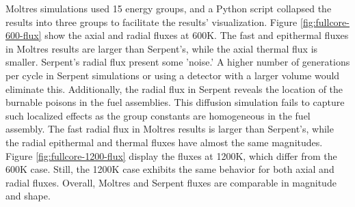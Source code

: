 Moltres simulations used 15 energy groups, and a Python script collapsed the results into three groups to facilitate the results' visualization.
Figure \ref{fig:fullcore-600-flux} show the axial and radial fluxes at 600K.
The fast and epithermal fluxes in Moltres results are larger than Serpent's, while the axial thermal flux is smaller.
Serpent's radial flux present some 'noise.'
A higher number of generations per cycle in Serpent simulations or using a detector with a larger volume would eliminate this.
Additionally, the radial flux in Serpent reveals the location of the burnable poisons in the fuel assemblies.
This diffusion simulation fails to capture such localized effects as the group constants are homogeneous in the fuel assembly.
The fast radial flux in Moltres results is larger than Serpent's, while the radial epithermal and thermal fluxes have almost the same magnitudes.
Figure \ref{fig:fullcore-1200-flux} display the fluxes at 1200K, which differ from the 600K case.
Still, the 1200K case exhibits the same behavior for both axial and radial fluxes.
Overall, Moltres and Serpent fluxes are comparable in magnitude and shape.




